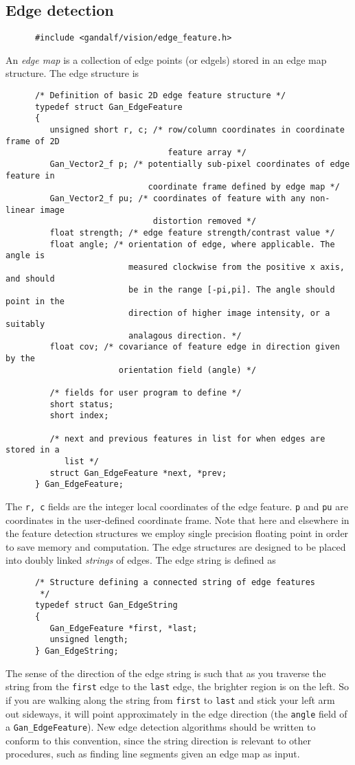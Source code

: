 \subsection{Edge detection}
\begin{verbatim}
      #include <gandalf/vision/edge_feature.h>
\end{verbatim}
An {\em edge map} is a collection of edge points (or edgels) stored in
an edge map structure. The edge structure is
\begin{verbatim}
      /* Definition of basic 2D edge feature structure */
      typedef struct Gan_EdgeFeature
      {
         unsigned short r, c; /* row/column coordinates in coordinate frame of 2D
                                 feature array */
         Gan_Vector2_f p; /* potentially sub-pixel coordinates of edge feature in
                             coordinate frame defined by edge map */
         Gan_Vector2_f pu; /* coordinates of feature with any non-linear image
                              distortion removed */
         float strength; /* edge feature strength/contrast value */
         float angle; /* orientation of edge, where applicable. The angle is
                         measured clockwise from the positive x axis, and should
                         be in the range [-pi,pi]. The angle should point in the
                         direction of higher image intensity, or a suitably
                         analagous direction. */
         float cov; /* covariance of feature edge in direction given by the
                       orientation field (angle) */
      
         /* fields for user program to define */
         short status;
         short index;
      
         /* next and previous features in list for when edges are stored in a
            list */
         struct Gan_EdgeFeature *next, *prev;
      } Gan_EdgeFeature;
\end{verbatim}
The {\tt r, c} fields are the integer local coordinates of the edge feature.
{\tt p} and {\tt pu} are coordinates in the user-defined coordinate frame.
Note that here and elsewhere in the feature detection structures we employ
single precision floating point in order to save memory and computation.
The edge structures are designed to be placed into doubly linked {\em strings}
of edges. The edge string is defined as
\begin{verbatim}
      /* Structure defining a connected string of edge features
       */
      typedef struct Gan_EdgeString
      {
         Gan_EdgeFeature *first, *last;
         unsigned length;
      } Gan_EdgeString;
\end{verbatim}
The sense of the direction of the edge string is such that as you traverse the
string from the {\tt first} edge to the {\tt last} edge, the brighter region
is on the left. So if you are walking along the string from {\tt first} to
{\tt last} and stick your left arm out sideways, it will point approximately
in the edge direction (the {\tt angle} field of a {\tt Gan\_EdgeFeature}).
New edge detection algorithms should be written to conform to this convention,
since the string direction is relevant to other procedures, such as
finding line segments given an edge map as input.


